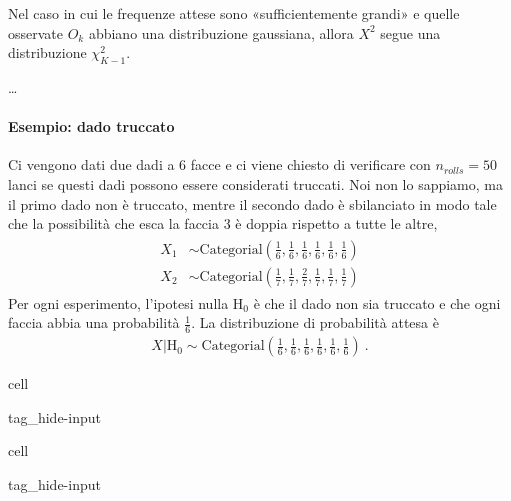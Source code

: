 \documentclass[letterpaper,10pt,italian]{jupyterBook}
\begin{document}
\sphinxAtStartPar
Nel caso in cui le frequenze attese sono «sufficientemente grandi» e quelle osservate \(O_k\) abbiano una distribuzione gaussiana, allora \(X^2\) segue una distribuzione \(\chi^2_{K-1}\).

\sphinxAtStartPar
… 


\paragraph{Esempio: dado truccato}
\label{\detokenize{ch/statistics/hp-test-single:esempio-dado-truccato}}
\sphinxAtStartPar
Ci vengono dati due dadi a 6 facce e ci viene chiesto di verificare con \(n_{rolls} = 50\) lanci se questi dadi possono essere considerati truccati. Noi non lo sappiamo, ma il primo dado non è truccato, mentre il secondo dado è sbilanciato in modo tale che la possibilità che esca la faccia 3 è doppia rispetto a tutte le altre,
\begin{equation*}
\begin{split}\begin{aligned}
X_1 & \sim \text{Categorial}\left(\frac{1}{6},\frac{1}{6},\frac{1}{6},\frac{1}{6},\frac{1}{6},\frac{1}{6}\right) \\
X_2 & \sim \text{Categorial}\left(\frac{1}{7},\frac{1}{7},\frac{2}{7},\frac{1}{7},\frac{1}{7},\frac{1}{7}\right) 
\end{aligned}\end{split}
\end{equation*}
\sphinxAtStartPar
Per ogni esperimento, l’ipotesi nulla \(\text{H}_0\) è che il dado non sia truccato e che ogni faccia abbia una probabilità \(\frac{1}{6}\). La distribuzione di probabilità attesa è
\begin{equation*}
\begin{split}X|\text{H}_0 \sim \text{Categorial}\left(\frac{1}{6},\frac{1}{6},\frac{1}{6},\frac{1}{6},\frac{1}{6},\frac{1}{6}\right) \ .\end{split}
\end{equation*}
\begin{sphinxuseclass}{cell}
\begin{sphinxuseclass}{tag_hide-input}
\end{sphinxuseclass}
\end{sphinxuseclass}
\begin{sphinxuseclass}{cell}
\begin{sphinxuseclass}{tag_hide-input}
\end{sphinxuseclass}
\end{sphinxuseclass}
\end{document}
